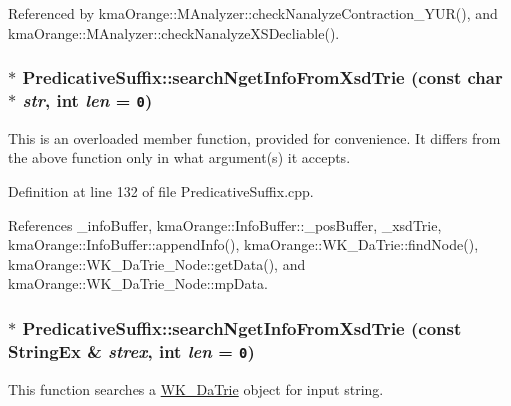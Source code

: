 Referenced by kmaOrange::MAnalyzer::checkNanalyzeContraction\_\-YUR(), and kmaOrange::MAnalyzer::checkNanalyzeXSDecliable().\hypertarget{classkmaOrange_1_1PredicativeSuffix_02bfeb30ea922631986bc132b160013e}{
\subsubsection[{searchNgetInfoFromXsdTrie}]{ $\ast$ PredicativeSuffix::searchNgetInfoFromXsdTrie (const char $\ast$ {\em str}, \/  int {\em len} = {\tt 0})}}
\label{classkmaOrange_1_1PredicativeSuffix_02bfeb30ea922631986bc132b160013e}


This is an overloaded member function, provided for convenience. It differs from the above function only in what argument(s) it accepts. 

Definition at line 132 of file PredicativeSuffix.cpp.

References \_\-infoBuffer, kmaOrange::InfoBuffer::\_\-posBuffer, \_\-xsdTrie, kmaOrange::InfoBuffer::appendInfo(), kmaOrange::WK\_\-DaTrie::findNode(), kmaOrange::WK\_\-DaTrie\_\-Node::getData(), and kmaOrange::WK\_\-DaTrie\_\-Node::mpData.\hypertarget{classkmaOrange_1_1PredicativeSuffix_32a95f75fba6fd1a53f7fe227b71e075}{
\subsubsection[{searchNgetInfoFromXsdTrie}]{ $\ast$ PredicativeSuffix::searchNgetInfoFromXsdTrie (const {\bf StringEx} \& {\em strex}, \/  int {\em len} = {\tt 0})}}
\label{classkmaOrange_1_1PredicativeSuffix_32a95f75fba6fd1a53f7fe227b71e075}


This function searches a \hyperlink{classkmaOrange_1_1WK__DaTrie}{WK\_\-DaTrie} object for input string. 

